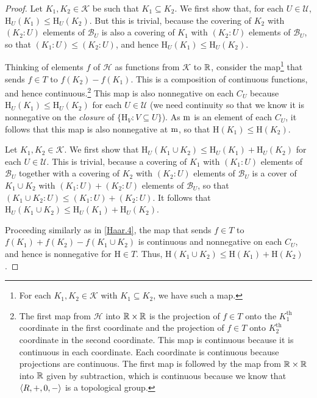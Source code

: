 \begin{thm}
\begin{proof}
\label{Haar.4}
Let $K_1,K_2\in \mathcal{K}$ be such that $K_1\subseteq K_2$.  We first show that, for each $U\in \mathcal{U}$, $\mathrm{H}_U(K_1)\leq \mathrm{H}_U(K_2)$.  But this is trivial, because the covering of $K_2$ with $(K_2:U)$ elements of $\mathcal{B}_U$ is also a covering of $K_1$ with $(K_2:U)$ elements of $\mathcal{B}_U$, so that $(K_1:U)\leq (K_2:U)$, and hence $\mathrm{H}_U(K_1)\leq \mathrm{H}_U(K_2)$.

Thinking of elements $f$ of $\mathcal{H}$ as functions from $\mathcal{K}$ to $\mathbb{R}$, consider the map\footnote{For each $K_1,K_2\in \mathcal{K}$ with $K_1\subseteq K_2$, we have such a map.} that sends $f\in T$ to $f(K_2)-f(K_1)$.  This is a composition of continuous functions, and hence continuous.\footnote{The first map from $\mathcal{H}$ into $\mathbb{R} \times \mathbb{R}$ is the projection of $f\in T$ onto the $K_1^{\text{th}}$ coordinate in the first coordinate and the projection of $f\in T$ onto $K_2^{\text{th}}$ coordinate in the second coordinate.  This map is continuous because it is continuous in each coordinate.  Each coordinate is continuous because projections are continuous.  The first map is followed by the map from $\mathbb{R} \times \mathbb{R}$ into $\mathbb{R}$ given by subtraction, which is continuous because we know that $\langle R,+,0,-\rangle$ is a topological group.}  This map is also nonnegative on each $C_U$ because $\mathrm{H}_U(K_1)\leq \mathrm{H}_U(K_2)$ for each $U\in \mathcal{U}$ (we need continuity so that we know it is nonnegative on the \emph{closure} of $\{ \mathrm{H}_V:V\subseteq U\}$).  As $\mathrm{m}$ is an element of each $C_U$, it follows that this map is also nonnegative at $\mathrm{m}$, so that $\mathrm{H}(K_1)\leq \mathrm{H}(K_2)$.

\label{Haar.5}
Let $K_1,K_2\in \mathcal{K}$.  We first show that $\mathrm{H}_U(K_1\cup K_2)\leq \mathrm{H}_U(K_1)+\mathrm{H}_U(K_2)$ for each $U\in \mathcal{U}$.  This is trivial, because a covering of $K_1$ with $(K_1:U)$ elements of $\mathcal{B}_U$ together with a covering of $K_2$ with $(K_2:U)$ elements of $\mathcal{B}_U$ is a cover of $K_1\cup K_2$ with $(K_1:U)+(K_2:U)$ elements of $\mathcal{B}_U$, so that $(K_1\cup K_2:U)\leq (K_1:U)+(K_2:U)$.  It follows that $\mathrm{H}_U(K_1\cup K_2)\leq \mathrm{H}_U(K_1)+\mathrm{H}_U(K_2)$.

Proceeding similarly as in \cref{Haar.4}, the map that sends $f\in T$ to $f(K_1)+f(K_2)-f(K_1\cup K_2)$ is continuous and nonnegative on each $C_U$, and hence is nonnegative for $\mathrm{H}\in T$.  Thus, $\mathrm{H}(K_1\cup K_2)\leq \mathrm{H}(K_1)+\mathrm{H}(K_2)$.


\end{proof}
\end{thm}
